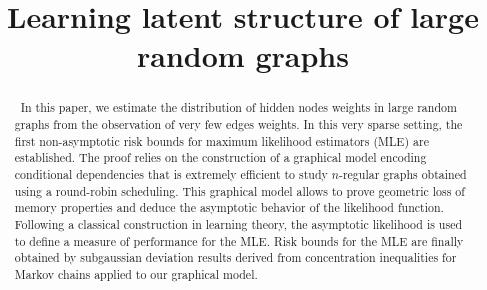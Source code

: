 

\begin{frontmatter}

\title{Learning latent structure of large random graphs}



\begin{abstract}~In this paper, we estimate the distribution of hidden nodes weights in large random graphs from the observation of very few edges weights. In this very sparse setting, the first non-asymptotic risk bounds for maximum likelihood estimators (MLE) are established. The proof relies on the construction of a graphical model encoding conditional dependencies that is extremely efficient to study $n$-regular graphs obtained using a round-robin scheduling. This graphical model allows to prove geometric loss of memory properties and deduce the asymptotic behavior of the likelihood function. Following a classical construction in learning theory, the asymptotic likelihood is used to define a measure of performance for the MLE. Risk bounds for the MLE are finally obtained by subgaussian deviation results derived from concentration inequalities for Markov chains applied to our graphical model.
\end{abstract}

\begin{keyword}[class=MSC]
\end{keyword}

\begin{keyword}
\end{keyword}

\end{frontmatter}



